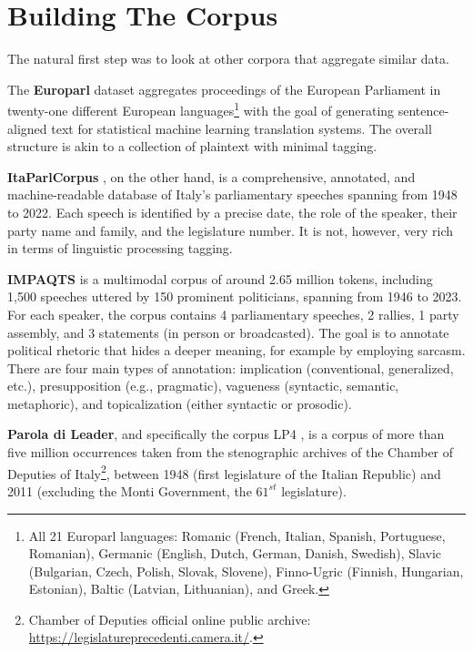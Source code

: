\section{Building The Corpus}

The natural first step was to look at other corpora that aggregate similar data.  

The \textbf{Europarl} dataset \cite{koehn_europarl_2005} aggregates proceedings of the European Parliament in twenty-one different European languages\footnote{All 21 Europarl languages: Romanic (French, Italian, Spanish, Portuguese, Romanian), Germanic (English, Dutch, German, Danish, Swedish), Slavic (Bulgarian, Czech, Polish, Slovak, Slovene), Finno-Ugric (Finnish, Hungarian, Estonian), Baltic (Latvian, Lithuanian), and Greek.} with the goal of generating sentence-aligned text for statistical machine learning translation systems. The overall structure is akin to a collection of plaintext with minimal tagging.

\textbf{ItaParlCorpus} \cite{cova_new_2025}, on the other hand, is a comprehensive, annotated, and machine-readable database of Italy's parliamentary speeches spanning from 1948 to 2022. Each speech is identified by a precise date, the role of the speaker, their party name and family, and the legislature number. It is not, however, very rich in terms of linguistic processing tagging.

\textbf{IMPAQTS} \cite{cominetti_impaqts_2024} is a multimodal corpus of around 2.65 million tokens, including 1,500 speeches uttered by 150 prominent politicians, spanning from 1946 to 2023. For each speaker, the corpus contains 4 parliamentary speeches, 2 rallies, 1 party assembly, and 3 statements (in person or broadcasted). The goal is to annotate political rhetoric that hides a deeper meaning, for example by employing sarcasm. There are four main types of annotation: implication (conventional, generalized, etc.), presupposition (e.g., pragmatic), vagueness (syntactic, semantic, metaphoric), and topicalization (either syntactic or prosodic).

\textbf{Parola di Leader}, and specifically the corpus LP4 \cite{giuliano_il_2019}, is a corpus of more than five million occurrences taken from the stenographic archives of the Chamber of Deputies of Italy\footnote{Chamber of Deputies official online public archive: \url{https://legislatureprecedenti.camera.it/}.}, between 1948 (first legislature of the Italian Republic) and 2011 (excluding the Monti Government, the $61^{st}$ legislature).

